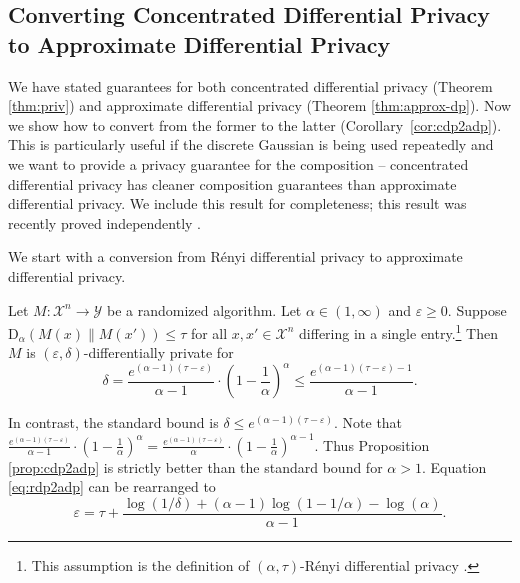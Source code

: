\documentclass{jpc}
\newcommand{\dr}[3]{\mathrm{D}_{#1}\left(#2\middle\|#3\right)}
\newcommand{\eps}{\varepsilon}
\begin{document}
\subsection{Converting Concentrated Differential Privacy to Approximate Differential Privacy}\label{sec:convert}

We have stated guarantees for both concentrated differential privacy (Theorem \ref{thm:priv}) and approximate differential privacy (Theorem \ref{thm:approx-dp}). Now we show how to convert from the former to the latter (Corollary~\ref{cor:cdp2adp}). This is particularly useful if the discrete Gaussian is being used repeatedly and we want to provide a privacy guarantee for the composition -- concentrated differential privacy has cleaner composition guarantees than approximate differential privacy. We include this result for completeness; this result was recently proved independently \cite[Lem.~1, Eq.~20]{AsoodehLCKS20}.

We start with a conversion from R\'enyi differential privacy to approximate differential privacy. 
\begin{prop}\label{prop:cdp2adp}
Let $M\colon \mathcal{X}^n \to \mathcal{Y}$ be a randomized algorithm. Let $\alpha \in (1,\infty)$ and $\eps\ge0$. Suppose $\dr{\alpha}{M(x)}{M(x')} \le \tau$ for all $x,x'\in\mathcal{X}^n$ differing in a single entry.\footnote{This assumption is the definition of $(\alpha,\tau)$-R\'enyi differential privacy \citep{Mironov17}.}
Then $M$ is $(\eps,\delta)$-differentially private for \begin{equation}
    \delta=\frac{e^{(\alpha-1)(\tau-\eps)}}{\alpha-1} \cdot \left(1-\frac{1}{\alpha}\right)^\alpha \le \frac{e^{(\alpha-1)(\tau-\eps)-1}}{\alpha-1}.\label{eq:rdp2adp}
\end{equation}
\end{prop}

In contrast, the standard bound \citep{DworkRV10,DworkR16,BunS16,Mironov17} is
$
    \delta \le e^{(\alpha-1)(\tau-\eps)}
$.
Note that $\frac{e^{(\alpha-1)(\tau-\eps)}}{\alpha-1} \cdot \left(1-\frac{1}{\alpha}\right)^\alpha = \frac{e^{(\alpha-1)(\tau-\eps)}}{\alpha} \cdot \left(1-\frac{1}{\alpha}\right)^{\alpha-1}$.
Thus Proposition \ref{prop:cdp2adp} is strictly better than the standard bound for $\alpha>1$.
Equation \ref{eq:rdp2adp} can be rearranged to
\begin{equation}
    \eps = \tau + \frac{\log(1/\delta) + (\alpha-1)\log(1-1/\alpha) - \log(\alpha)}{\alpha-1}.
\end{equation}
\end{document}
